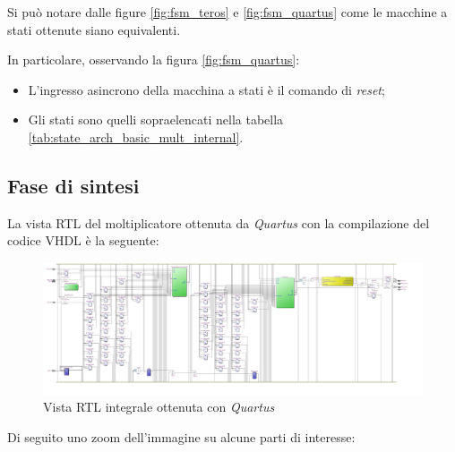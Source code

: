 \documentclass[titlepage]{report}
\begin{document}
			Si può notare dalle figure \ref{fig:fsm_teros} e \ref{fig:fsm_quartus} come le macchine a stati ottenute siano equivalenti.

			In particolare, osservando la figura \ref{fig:fsm_quartus}:

			\begin{itemize}
				\item L'ingresso asincrono della macchina a stati è il comando di \textit{reset};
				\item Gli stati sono quelli sopraelencati nella tabella \ref{tab:state_arch_basic_mult_internal}.
			\end{itemize}
				

		\subsection*{Fase di sintesi}
		\label{subsec:basic_mult_fase_sintesi}
			
			La vista RTL del moltiplicatore ottenuta da \textit{Quartus} con la compilazione del codice VHDL è la seguente:

			\begin{figure}[H]
				\centering
				\includegraphics[scale=0.15]{./img/rtl_basic_mult_complete.jpg}
				\caption{Vista RTL integrale ottenuta con \textit{Quartus}}
				\label{fig:rtl_quartus}
			\end{figure}	

			Di seguito uno zoom dell'immagine su alcune parti di interesse: 
\end{document}
